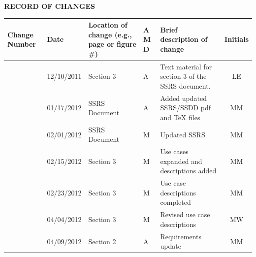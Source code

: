 \documentclass[twoside,letterpaper]{article}
\begin{document}


\bigskip


{\centering\bfseries RECORD OF CHANGES \par}


\bigskip

\begin{flushleft}
\tablehead{}
\begin{supertabular}[c]{|m{0.75in}|m{1.0in}|m{1.5in}|m{0.25in}|m{2in}|c|}
\hline

\centering \bfseries Change
\centering \bfseries Number
&

\centering \bfseries Date
\par
&

\centering \bfseries Location of change\newline
\centering \bfseries(e.g., page or figure \#)
&

\centering \bfseries A\newline
\centering \bfseries M\newline
\centering \bfseries D  
&

\centering \bfseries Brief description\newline
\centering \bfseries of change
&
\bfseries Initials
\\\hline

& 12/10/2011
& Section 3
& \centering A
& Text material for section 3 of the SSRS document.
& LE

\\\hline
{}
& 01/17/2012
& SSRS Document
& \centering A
& Added updated SSRS/SSDD pdf and TeX files
& MM

\\\hline
{}
& 02/01/2012
& SSRS Document
& \centering M
& Updated SSRS
& MM

\\\hline
{}
& 02/15/2012
& Section 3
& \centering M
& Use cases expanded and descriptions added
& MM

\\\hline
{}
& 02/23/2012
& Section 3
& \centering M
& Use case descriptions completed
& MM

\\\hline
{}
& 04/04/2012
& Section 3
& \centering M
& Revised use case descriptions
& MW

\\\hline
{}
& 04/09/2012
& Section 2
& \centering A
& Requirements update
& MM


\end{supertabular}
\end{flushleft}
\end{document}
